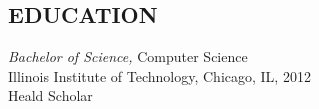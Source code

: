 \documentclass[margin]{res}
\begin{document}
\begin{resume}
\section{EDUCATION} {\sl Bachelor of Science,} Computer Science \\
                Illinois Institute of Technology, Chicago, IL, 
                2012 \\
                Heald Scholar \\
                

\end{resume}
\end{document}
